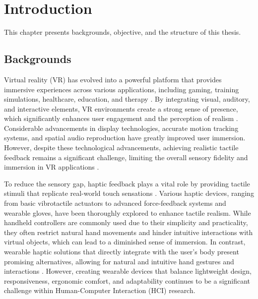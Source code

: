 
\chapter{Introduction} %

\label{Chapter1} %


\newcommand{\keyword}[1]{\textbf{#1}}
\newcommand{\tabhead}[1]{\textbf{#1}}
\newcommand{\code}[1]{\texttt{#1}}
\newcommand{\file}[1]{\texttt{\bfseries#1}}
\newcommand{\option}[1]{\texttt{\itshape#1}}

This chapter presents backgrounds, objective, and the structure of this thesis.

\section{Backgrounds}
Virtual reality (VR) has evolved into a powerful platform that provides immersive experiences across various applications, including gaming, training simulations, healthcare, education, and therapy \cite{10.3389/frobt.2016.00074}. By integrating visual, auditory, and interactive elements, VR environments create a strong sense of presence, which significantly enhances user engagement and the perception of realism \cite{10.5555/207922}. Considerable advancements in display technologies, accurate motion tracking systems, and spatial audio reproduction have greatly improved user immersion. However, despite these technological advancements, achieving realistic tactile feedback remains a significant challenge, limiting the overall sensory fidelity and immersion in VR applications \cite{10.1146/annurev-control-060117-105043}.

To reduce the sensory gap, haptic feedback plays a vital role by providing tactile stimuli that replicate real-world touch sensations \cite{10.1146/annurev-control-060117-105043}. Various haptic devices, ranging from basic vibrotactile actuators to advanced force-feedback systems and wearable gloves, have been thoroughly explored to enhance tactile realism. While handheld controllers are commonly used due to their simplicity and practicality, they often restrict natural hand movements and hinder intuitive interactions with virtual objects, which can lead to a diminished sense of immersion. In contrast, wearable haptic solutions that directly integrate with the user's body present promising alternatives, allowing for natural and intuitive hand gestures and interactions \cite{7922602}. However, creating wearable devices that balance lightweight design, responsiveness, ergonomic comfort, and adaptability continues to be a significant challenge within Human-Computer Interaction (HCI) research.

